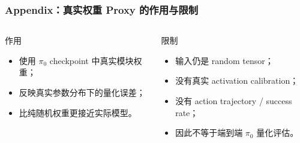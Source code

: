 \documentclass[10pt, aspectratio=169]{beamer}
\begin{document}
\begin{frame}
  \frametitle{Appendix：真实权重 Proxy 的作用与限制}
  \small
  \begin{columns}[T,onlytextwidth]
    \begin{block}{作用}
      \begin{itemize}
        \item 使用 $\pi_0$ checkpoint 中真实模块权重；
        \item 反映真实参数分布下的量化误差；
        \item 比纯随机权重更接近实际模型。
      \end{itemize}
    \end{block}

    \begin{alertblock}{限制}
      \begin{itemize}
        \item 输入仍是 random tensor；
        \item 没有真实 activation calibration；
        \item 没有 action trajectory / success rate；
        \item 因此不等于端到端 $\pi_0$ 量化评估。
      \end{itemize}
    \end{alertblock}
  \end{columns}
\end{frame}
\end{document}

